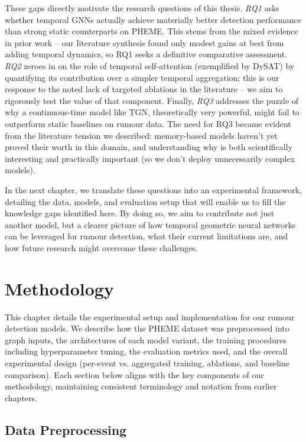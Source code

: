 \documentclass{cshonours}
\begin{document}
These gaps directly motivate the research questions of this thesis. \emph{RQ1} asks whether temporal GNNs actually achieve materially better detection performance than strong static counterparts on PHEME. This stems from the mixed evidence in prior work – our literature synthesis found only modest gains at best from adding temporal dynamics, so RQ1 seeks a definitive comparative assessment. \emph{RQ2} zeroes in on the role of temporal self-attention (exemplified by DySAT) by quantifying its contribution over a simpler temporal aggregation; this is our response to the noted lack of targeted ablations in the literature – we aim to rigorously test the value of that component. Finally, \emph{RQ3} addresses the puzzle of why a continuous-time model like TGN, theoretically very powerful, might fail to outperform static baselines on rumour data. The need for RQ3 became evident from the literature tension we described: memory-based models haven’t yet proved their worth in this domain, and understanding why is both scientifically interesting and practically important (so we don’t deploy unnecessarily complex models). 

In the next chapter, we translate these questions into an experimental framework, detailing the data, models, and evaluation setup that will enable us to fill the knowledge gaps identified here. By doing so, we aim to contribute not just another model, but a clearer picture of how temporal geometric neural networks can be leveraged for rumour detection, what their current limitations are, and how future research might overcome these challenges.

\chapter{Methodology}\label{chap:methodology}

This chapter details the experimental setup and implementation for our rumour detection models. We describe how the PHEME dataset was preprocessed into graph inputs, the architectures of each model variant, the training procedures including hyperparameter tuning, the evaluation metrics used, and the overall experimental design (per-event vs. aggregated training, ablations, and baseline comparison). Each section below aligns with the key components of our methodology, maintaining consistent terminology and notation from earlier chapters.

\section{Data Preprocessing}
\end{document}
